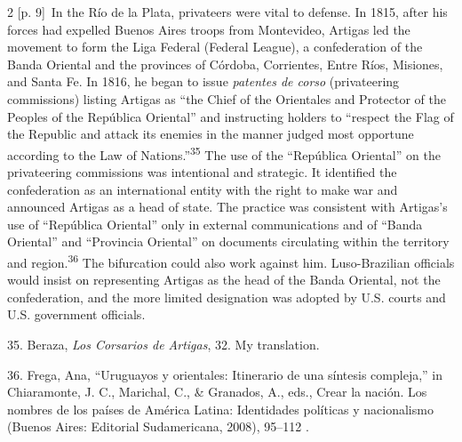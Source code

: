 \documentclass[10pt,a4paper]{article}
\begin{document}
\begin{paracol}{2}
{\scriptsize\color{gray} [p. 9]}\ In the Río de la Plata, privateers were vital to defense. In 1815, after his forces had expelled Buenos Aires troops from Montevideo, Artigas led the movement to form the Liga Federal (Federal League), a confederation of the Banda Oriental and the provinces of Córdoba, Corrientes, Entre Ríos, Misiones, and Santa Fe. In 1816, he began to issue \textit{patentes de corso} (privateering commissions) listing Artigas as “the Chief of the Orientales and Protector of the Peoples of the República Oriental” and instructing holders to “respect the Flag of the Republic and attack its enemies in the manner judged most opportune according to the Law of Nations.”\nobreak\textsuperscript{35} The use of the “República Oriental” on the privateering commissions was intentional and strategic. It identified the confederation as an international entity with the right to make war and announced Artigas as a head of state. The practice was consistent with Artigas’s use of “República Oriental” only in external communications and of “Banda Oriental” and “Provincia Oriental” on documents circulating within the territory and region.\nobreak\textsuperscript{36} The bifurcation could also work against him. Luso-Brazilian officials would insist on representing Artigas as the head of the Banda Oriental, not the confederation, and the more limited designation was adopted by U.S. courts and U.S. government officials.\par{\small 35. Beraza, \textit{Los Corsarios de Artigas}, 32. My translation.\par}{\small 36. Frega, Ana, “Uruguayos y orientales: Itinerario de una síntesis compleja,” in Chiaramonte, J. C., Marichal, C., \& Granados, A., eds., Crear la nación. Los nombres de los países de América Latina: Identidades políticas y nacionalismo (Buenos Aires: Editorial Sudamericana, 2008), 95–112 .\par}
\switchcolumn*

\end{paracol}
\end{document}
